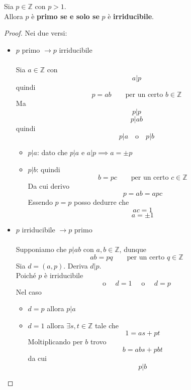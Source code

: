 \documentclass[a4paper,12pt, oneside]{book}
\begin{document}
	\begin{teorema}
		Sia $p \in \mathbb{Z}$ con $p > 1$.\\
		Allora $p$ è \textbf{primo se e solo se} $p$ è \textbf{irriducibile}.
		
		\begin{proof}Nei due versi:
			\begin{itemize}
				\item $p$ primo $\rightarrow p$ irriducibile\\\\
					Sia $a \in \mathbb{Z}$ con $$a|p$$ quindi $$p=ab \qquad \mbox{per un certo } b \in \mathbb{Z}$$
					Ma $$p|p$$ 
					$$p|ab$$ quindi 
					$$p|a \quad \mbox{o} \quad p|b$$
					\begin{itemize}
						\item $p|a$: dato che $p|a$ e $a|p \implies a = \pm p$
						\item $p|b$: quindi
							$$b=pc \qquad \mbox{per un certo } c \in \mathbb{Z}$$
							Da cui derivo $$p=ab=apc$$
							Essendo $p=p$ posso dedurre che
							$$ac=1$$
							$$a=\pm 1$$
					\end{itemize}					
				\item $p$ irriducibile $\rightarrow p$ primo\\\\
					Supponiamo che $p|ab$ con $a,b \in \mathbb{Z}$, dunque 
					$$ab=pq \qquad \mbox{per un certo } q \in \mathbb{Z}$$
					Sia $d=(a,p)$.
					Deriva $d|p$.\\
					Poiché $p$ è irriducibile
					$$\mbox{o }\quad d=1 \quad\mbox{ o }\quad d=p$$
					Nel caso \begin{itemize}
						\item $d=p$ allora $p|a$
						\item $d=1$ allora $\exists s,t \in \mathbb{Z}$
							tale che $$1=as+pt$$
							Moltiplicando per $b$ trovo
							$$b = abs + pbt$$
							da cui $$p|b$$
					\end{itemize}
			\end{itemize}
		\end{proof}
	\end{teorema}
	
\end{document}
